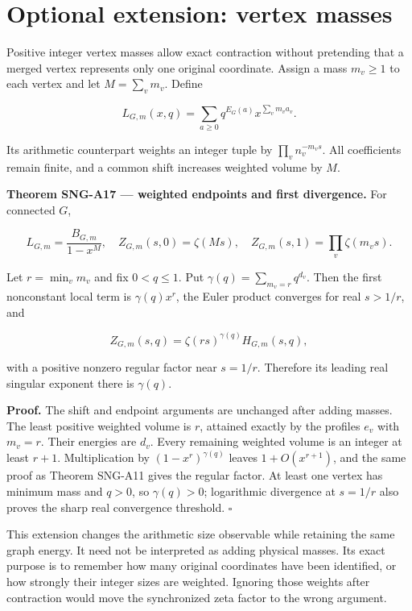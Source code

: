 \documentclass[
  11pt,
  a4paper,
]{report}
\begin{document}
\hypertarget{optional-extension-vertex-masses}{%
\section{Optional extension: vertex
masses}\label{optional-extension-vertex-masses}}

Positive integer vertex masses allow exact contraction without
pretending that a merged vertex represents only one original coordinate.
Assign a mass \(m_v\ge1\) to each vertex and let \(M=\sum_vm_v\). Define

\[
 L_{G,m}(x,q)=\sum_{a\ge0}q^{E_G(a)}x^{\sum_vm_va_v}.
\]

Its arithmetic counterpart weights an integer tuple by
\(\prod_vn_v^{-m_vs}\). All coefficients remain finite, and a common
shift increases weighted volume by \(M\).

\textbf{Theorem SNG-A17 --- weighted endpoints and first divergence.}
For connected \(G\),

\[
 L_{G,m}=\frac{B_{G,m}}{1-x^M},\quad
 Z_{G,m}(s,0)=\zeta(Ms),\quad
 Z_{G,m}(s,1)=\prod_v\zeta(m_vs).
\]

Let \(r=\min_vm_v\) and fix \(0<q\le1\). Put
\(\gamma(q)=\sum_{m_v=r}q^{d_v}\). Then the first nonconstant local term
is \(\gamma(q)x^r\), the Euler product converges for real \(s>1/r\), and

\[
 Z_{G,m}(s,q)=\zeta(rs)^{\gamma(q)}H_{G,m}(s,q),
\]

with a positive nonzero regular factor near \(s=1/r\). Therefore its
leading real singular exponent there is \(\gamma(q)\).

\textbf{Proof.} The shift and endpoint arguments are unchanged after
adding masses. The least positive weighted volume is \(r\), attained
exactly by the profiles \(e_v\) with \(m_v=r\). Their energies are
\(d_v\). Every remaining weighted volume is an integer at least \(r+1\).
Multiplication by \((1-x^r)^{\gamma(q)}\) leaves \(1+O(x^{r+1})\), and
the same proof as Theorem SNG-A11 gives the regular factor. At least one
vertex has minimum mass and \(q>0\), so \(\gamma(q)>0\); logarithmic
divergence at \(s=1/r\) also proves the sharp real convergence
threshold. \(\square\)

This extension changes the arithmetic size observable while retaining
the same graph energy. It need not be interpreted as adding physical
masses. Its exact purpose is to remember how many original coordinates
have been identified, or how strongly their integer sizes are weighted.
Ignoring those weights after contraction would move the synchronized
zeta factor to the wrong argument.
\end{document}

